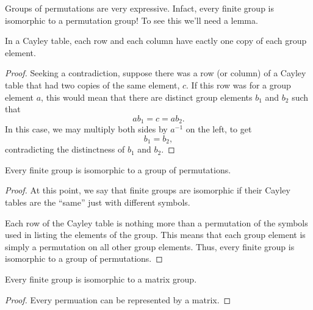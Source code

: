 \documentclass{ximera}
\begin{document}
Groups of permutations are very expressive. Infact, every finite group
is isomorphic to a permutation group! To see this we'll need a lemma.

\begin{lemma}
  In a Cayley table, each row and each column have eactly one copy of
  each group element.
  \begin{proof}
    Seeking a contradiction, suppose there was a row (or column) of a
    Cayley table that had two copies of the same element, $c$. If this
    row was for a group element $a$, this would mean that there are
    distinct group elements $b_1$ and $b_2$ such that
    \[
    ab_1 =c = ab_2.
    \]
    In this case, we may multiply both sides by $a^{-1}$ on the left,
    to get
    \[
    b_1 = b_2,
    \]
    contradicting the distinctness of $b_1$ and $b_2$.
  \end{proof}
\end{lemma}


\begin{theorem}
  Every finite group is isomorphic to a group of permutations.
  \begin{proof}
    At this point, we say that finite groups are isomorphic if their
    Cayley tables are the ``same'' just with different symbols.


    Each row of the Cayley table is nothing more than a permutation of
    the symbols used in listing the elements of the group. This means
    that each group element is simply a permutation on all other group
    elements. Thus, every finite group is isomorphic to a group of
    permutations.
  \end{proof}
\end{theorem}

\begin{corollary}
  Every finite group is isomorphic to a matrix group.
  \begin{proof}
    Every permuation can be represented by a matrix.
  \end{proof}
\end{corollary}
\end{document}
